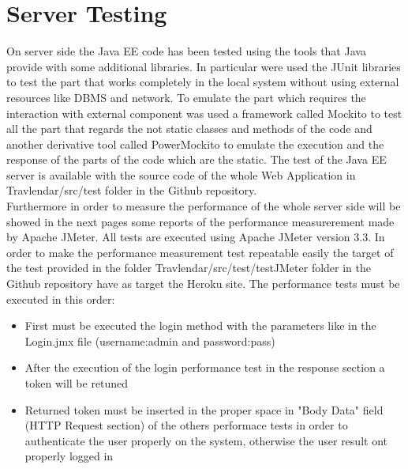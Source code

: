 \documentclass[numbers=noenddot, 12pt, a4paper, oneside]{scrbook}
\begin{document}
\section*{Server Testing}
On server side the Java EE code has been tested using the tools that Java provide with some additional libraries. In particular were used the JUnit libraries to test the part that works completely in the local system without using external resources like DBMS and network.
To emulate the part which requires the interaction with external component was used a framework called Mockito to test all the part that regards the not static classes and methods of the code and another derivative tool called PowerMockito to emulate the execution and the response of the parts of the code which are the static. 
The test of the Java EE server is available with the source code of the whole Web Application in Travlendar/src/test folder in the Github repository.\\

Furthermore in order to measure the performance of the whole server side will be showed in the next pages some reports of the performance measurerement made by Apache JMeter.
All tests are executed using Apache JMeter version 3.3.
In order to make the performance measurement test repeatable easily the target of the test provided in the folder Travlendar/src/test/testJMeter folder in the Github repository have as target the Heroku site.
The performance tests must be executed in this order:
\begin{itemize}
	\item First must be executed the login method with the parameters like in the Login.jmx file (username:admin and password:pass)
	\item After the execution of the login performance test in the response section a token will be retuned
	\item Returned token must be inserted in the proper space in "Body Data" field (HTTP Request section) of the others performace tests in order to authenticate the user properly on the system, otherwise the user result ont properly logged in
\end{itemize}
\end{document}
